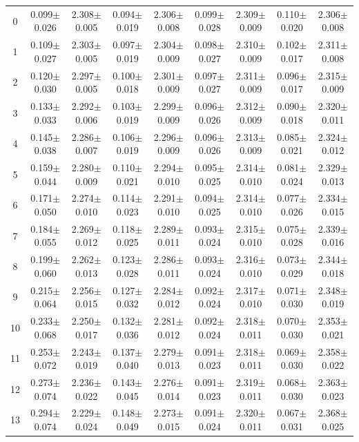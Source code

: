 \begin{table}[H]
{\begin{tabular}{c cc cc cc cc}
0 & 0.099$\pm$0.026 & 2.308$\pm$0.005 & 0.094$\pm$0.019 & 2.306$\pm$0.008 & 0.099$\pm$0.028 & 2.309$\pm$0.009 & 0.110$\pm$0.020 & 2.306$\pm$0.008 \\
1 & 0.109$\pm$0.027 & 2.303$\pm$0.005 & 0.097$\pm$0.019 & 2.304$\pm$0.009 & 0.098$\pm$0.027 & 2.310$\pm$0.009 & 0.102$\pm$0.017 & 2.311$\pm$0.008 \\
2 & 0.120$\pm$0.030 & 2.297$\pm$0.005 & 0.100$\pm$0.018 & 2.301$\pm$0.009 & 0.097$\pm$0.027 & 2.311$\pm$0.009 & 0.096$\pm$0.017 & 2.315$\pm$0.009 \\
3 & 0.133$\pm$0.033 & 2.292$\pm$0.006 & 0.103$\pm$0.019 & 2.299$\pm$0.009 & 0.096$\pm$0.026 & 2.312$\pm$0.009 & 0.090$\pm$0.018 & 2.320$\pm$0.011 \\
4 & 0.145$\pm$0.038 & 2.286$\pm$0.007 & 0.106$\pm$0.019 & 2.296$\pm$0.009 & 0.096$\pm$0.026 & 2.313$\pm$0.009 & 0.085$\pm$0.021 & 2.324$\pm$0.012 \\
5 & 0.159$\pm$0.044 & 2.280$\pm$0.009 & 0.110$\pm$0.021 & 2.294$\pm$0.010 & 0.095$\pm$0.025 & 2.314$\pm$0.010 & 0.081$\pm$0.024 & 2.329$\pm$0.013 \\
6 & 0.171$\pm$0.050 & 2.274$\pm$0.010 & 0.114$\pm$0.023 & 2.291$\pm$0.010 & 0.094$\pm$0.025 & 2.314$\pm$0.010 & 0.077$\pm$0.026 & 2.334$\pm$0.015 \\
7 & 0.184$\pm$0.055 & 2.269$\pm$0.012 & 0.118$\pm$0.025 & 2.289$\pm$0.011 & 0.093$\pm$0.024 & 2.315$\pm$0.010 & 0.075$\pm$0.028 & 2.339$\pm$0.016 \\
8 & 0.199$\pm$0.060 & 2.262$\pm$0.013 & 0.123$\pm$0.028 & 2.286$\pm$0.011 & 0.093$\pm$0.024 & 2.316$\pm$0.010 & 0.073$\pm$0.029 & 2.344$\pm$0.018 \\
9 & 0.215$\pm$0.064 & 2.256$\pm$0.015 & 0.127$\pm$0.032 & 2.284$\pm$0.012 & 0.092$\pm$0.024 & 2.317$\pm$0.010 & 0.071$\pm$0.030 & 2.348$\pm$0.019 \\
10 & 0.233$\pm$0.068 & 2.250$\pm$0.017 & 0.132$\pm$0.036 & 2.281$\pm$0.012 & 0.092$\pm$0.024 & 2.318$\pm$0.011 & 0.070$\pm$0.030 & 2.353$\pm$0.021 \\
11 & 0.253$\pm$0.072 & 2.243$\pm$0.019 & 0.137$\pm$0.040 & 2.279$\pm$0.013 & 0.091$\pm$0.023 & 2.318$\pm$0.011 & 0.069$\pm$0.030 & 2.358$\pm$0.022 \\
12 & 0.273$\pm$0.074 & 2.236$\pm$0.022 & 0.143$\pm$0.045 & 2.276$\pm$0.014 & 0.091$\pm$0.023 & 2.319$\pm$0.011 & 0.068$\pm$0.030 & 2.363$\pm$0.023 \\
13 & 0.294$\pm$0.074 & 2.229$\pm$0.024 & 0.148$\pm$0.049 & 2.273$\pm$0.015 & 0.091$\pm$0.024 & 2.320$\pm$0.011 & 0.067$\pm$0.031 & 2.368$\pm$0.025 \\

\end{tabular}}
\end{table}
